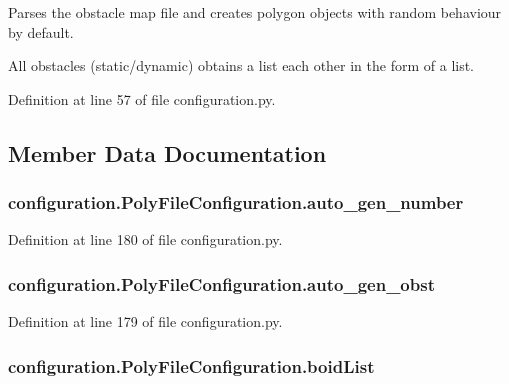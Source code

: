 Parses the obstacle map file and creates polygon objects with random behaviour by default. 

All obstacles (static/dynamic) obtains a list each other in the form of a list. 

Definition at line 57 of file configuration.\-py.



\subsection{Member Data Documentation}
\hypertarget{classconfiguration_1_1PolyFileConfiguration_aa3e815b8a45413bbb05095ef9dba3fe7}{
\subsubsection[{auto\-\_\-gen\-\_\-number}]{\setlength{\rightskip}{0pt plus 5cm}configuration.\-Poly\-File\-Configuration.\-auto\-\_\-gen\-\_\-number}}\label{classconfiguration_1_1PolyFileConfiguration_aa3e815b8a45413bbb05095ef9dba3fe7}


Definition at line 180 of file configuration.\-py.

\hypertarget{classconfiguration_1_1PolyFileConfiguration_a23d5fb751d566d6705ffd1bec2e63db9}{
\subsubsection[{auto\-\_\-gen\-\_\-obst}]{\setlength{\rightskip}{0pt plus 5cm}configuration.\-Poly\-File\-Configuration.\-auto\-\_\-gen\-\_\-obst}}\label{classconfiguration_1_1PolyFileConfiguration_a23d5fb751d566d6705ffd1bec2e63db9}


Definition at line 179 of file configuration.\-py.

\hypertarget{classconfiguration_1_1PolyFileConfiguration_a34104bbe3eb34147465a4d9e05d6c6b6}{
\subsubsection[{boid\-List}]{\setlength{\rightskip}{0pt plus 5cm}configuration.\-Poly\-File\-Configuration.\-boid\-List}}\label{classconfiguration_1_1PolyFileConfiguration_a34104bbe3eb34147465a4d9e05d6c6b6}


